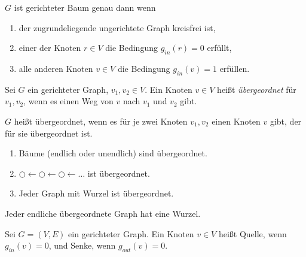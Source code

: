 \begin{bemerkung}
    $G$ ist gerichteter Baum genau dann wenn
    \begin{enumerate}
        \item der zugrundeliegende ungerichtete Graph kreisfrei ist,
        \item einer der Knoten $r \in V$ die Bedingung $g_{in}(r) = 0$ erfüllt,
        \item alle anderen Knoten $v \in V$ die Bedingung $g_{in}(v) = 1$ erfüllen.
    \end{enumerate}
\end{bemerkung}


\begin{definition}

    Sei $G$ ein gerichteter Graph, $v_1, v_2 \in V$. Ein Knoten $v \in V$ heißt
    \emph{übergeordnet} für $v_1, v_2$, wenn es einen Weg von $v$ nach $v_1$
    und $v_2$ gibt.
    
    $G$ heißt übergeordnet, wenn es für je zwei Knoten $v_1, v_2$ einen Knoten
    $v$ gibt, der für sie übergeordnet ist.
    
    \begin{enumerate}
        \item Bäume (endlich oder unendlich) sind übergeordnet.
        \item $\bigcirc \leftarrow \bigcirc \leftarrow \bigcirc \leftarrow
            \dots$ ist übergeordnet.
        \item Jeder Graph mit Wurzel ist übergeordnet.
    \end{enumerate}
\end{definition}


\begin{bemerkung}
    Jeder endliche übergeordnete Graph hat eine Wurzel.
\end{bemerkung}


\begin{definition}

    Sei $G = (V,E)$ ein gerichteter Graph. Ein Knoten $v \in V$ heißt Quelle,
    wenn $g_{in}(v) = 0$, und Senke, wenn $g_{out}(v) = 0$.

\end{definition}
